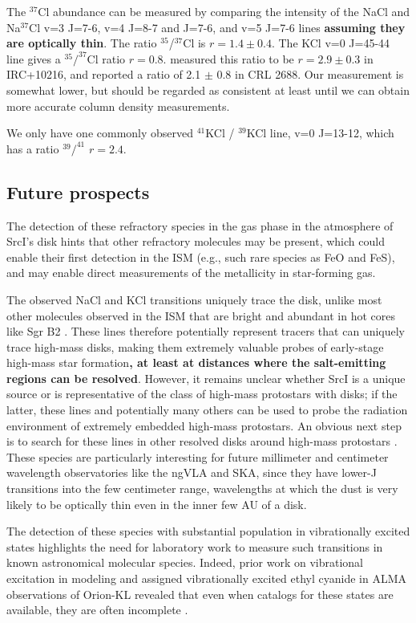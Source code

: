 \documentclass[twocolumn]{aastex62}
\newcommand{\sourcei}{SrcI\xspace}
\newcommand{\referee}[1]{\textbf{#1}}
\begin{document}
The $^{37}$Cl abundance can be measured by comparing the intensity of the NaCl
and Na$^{37}$Cl v=3 J=7-6, v=4 J=8-7 and J=7-6, and v=5 J=7-6 lines
\referee{assuming they are optically thin}.  The ratio $^{35}$/$^{37}$Cl is
$r=1.4\pm0.4$.  The KCl v=0 J=45-44 line gives a $^{35}/^{37}$Cl ratio $r=0.8$.
\citet{Agundez2012a} measured this ratio to be $r=2.9\pm0.3$ in IRC+10216, and
\citet{Highberger2003a} reported a ratio of 2.1 $\pm$ 0.8 in CRL 2688.  Our
measurement is somewhat lower, but should be regarded as consistent at least
until we can obtain more accurate column density measurements. 


We only have one commonly observed $^{41}$KCl / $^{39}$KCl line, v=0 J=13-12,
which has a ratio $^{39}/^{41}$ $r=2.4$. 


\subsection{Future prospects}
The detection of these refractory species in the gas phase in the atmosphere
of \sourcei's disk hints that other refractory molecules may be present, 
which could enable their first detection in the ISM (e.g., such rare species as
FeO and FeS), and may enable direct measurements of the metallicity in
star-forming gas.

The observed NaCl and KCl transitions uniquely trace the disk, unlike most other
molecules observed in the ISM that are bright and abundant in hot cores like
Sgr B2 \citep{Nummelin1998a,Belloche2013a}.  These lines therefore potentially
represent tracers that can uniquely trace high-mass disks, making them extremely
valuable probes of early-stage high-mass star formation\referee{, at least at
distances where the salt-emitting regions can be resolved}.
However, it remains unclear whether \sourcei is a unique source or is
representative of the class of high-mass protostars with disks; if the latter,
these lines and potentially many others can be used to probe the radiation
environment of extremely embedded high-mass protostars.  An obvious next step
is to search for these lines in other resolved disks around high-mass
protostars \citep[e.g.  HH80/81;][]{Girart2017a}.  These species are
particularly interesting for future millimeter and centimeter wavelength
observatories like the ngVLA and SKA, since they have lower-J transitions into
the few centimeter range, wavelengths at which the dust is very likely
to be optically thin even in the inner few AU of a disk.

The detection of these species with substantial population in vibrationally
excited states highlights the need for laboratory work to measure such
transitions in known astronomical molecular species. Indeed, prior work on
vibrational excitation in modeling and assigned vibrationally excited ethyl
cyanide in ALMA observations of Orion-KL revealed that even when catalogs for
these states are available, they are often incomplete \citep{Fortman2012a}.
\end{document}
